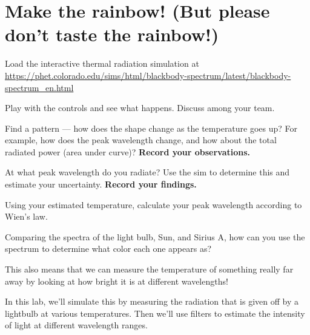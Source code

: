\section{Make the rainbow! (But please don't taste the rainbow!)}
\label{ic:sec:exploring}

\begin{steps}
\item\label{ic:step:load-sim} Load the interactive thermal radiation simulation
at
\url{https://phet.colorado.edu/sims/html/blackbody-spectrum/latest/blackbody-spectrum_en.html}

\item Play with the controls and see what happens. Discuss among your team.

\item Find a pattern --- how does the shape change as the temperature goes up? 
For example, how does the peak wavelength change, and how about the total
radiated power (area under curve)? \textbf{Record your observations.}
        
\item At what peak wavelength do you radiate? Use the sim to determine this and 
estimate your uncertainty. \textbf{Record your findings.}

\item Using your estimated temperature, calculate your peak wavelength 
according to Wien's law.

\item\label{ic:step:qual-color} Comparing the spectra of the light bulb, Sun, 
and Sirius A, how can you use the spectrum to determine what color each one
appears as?
\end{steps}

\noindent
{}
\hspace{0.3cm}
\vspace{0.2cm}
\begin{minipage}{0.5\textwidth}
This also means that we can measure the temperature of something really far
away by looking at how bright it is at different wavelengths!

In this lab, we'll simulate this by measuring the radiation that is given off
by a lightbulb at various temperatures.  Then we'll use filters to estimate the
intensity of light at different wavelength ranges.
\end{minipage} 

